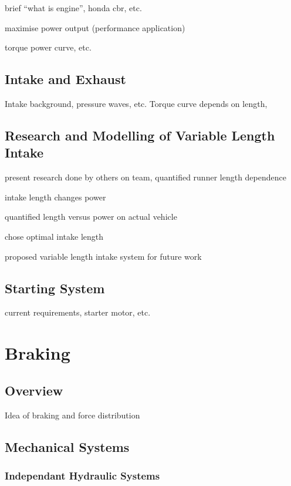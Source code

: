 brief {}``what is engine'', honda cbr, etc.

maximise power output (performance application)

torque power curve, etc.


\subsection{Intake and Exhaust}

Intake background, pressure waves, etc. Torque curve depends on length, 


\subsection{Research and Modelling of Variable Length Intake}

present research done by others on team, quantified runner length
dependence

intake length changes power

quantified length versus power on actual vehicle

chose optimal intake length

proposed variable length intake system for future work


\subsection{Starting System}

current requirements, starter motor, etc.


\section{Braking}


\subsection{Overview}

Idea of braking and force distribution


\subsection{Mechanical Systems}


\subsubsection{Independant Hydraulic Systems}


